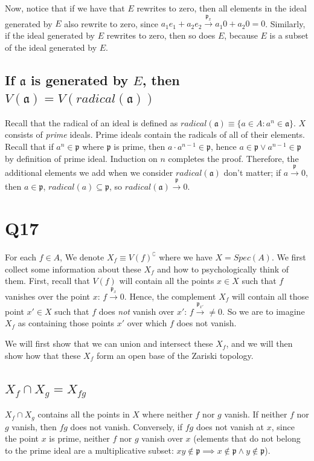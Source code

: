 \documentclass{book}
\newcommand{\frakp}{\ensuremath{\mathfrak{p}}}
\newcommand{\fraka}{\ensuremath{\mathfrak{a}}}
\renewcommand{\c}{\complement} %
\theoremstyle{definition}
\begin{document}
Now, notice that if we have that $E$ rewrites to zero, then all elements
in the ideal generated by $E$ also rewrite to zero, since $a_1 e_1 + a_2 e_2 \xrightarrow{\frakp_x} a_1 0 + a_2 0 = 0$.
Similarly, if the ideal generated by $E$ rewrites to zero, then so does $E$, 
because $E$ is a subset of the ideal generated by $E$.

\subsection{If $\fraka$ is generated by $E$, then $V(\fraka) = V(radical(\fraka))$}

Recall that the radical of an ideal is defined as $radical(\fraka) \equiv \{ a \in A : a^n \in \fraka \}$.
$X$ consists of \emph{prime} ideals. Prime ideals contain the radicals of all of
their elements. Recall that if $a^n \in \frakp$ where $\frakp$ is prime, then $a \cdot a^{n-1} \in \frakp$, hence
$a \in \frakp \lor a^{n-1} \in \frakp$ by definition of prime ideal. Induction on $n$ completes
the proof. Therefore, the additional elements we add when we consider $radical(\fraka)$
don't matter; if $a \xrightarrow{\frakp} 0$, then $a \in \frakp$, $radical(a) \subseteq \frakp$,
so $radical(\fraka) \xrightarrow{\frakp} 0$.

\section{Q17}

For each $f \in A$, We denote $X_f \equiv V(f)^\c$ where we have $X = Spec(A)$.
We first collect some information about these $X_f$ and how to psychologically
think of them. First, recall that $V(f)$ will contain all the points $x \in X$ such
that $f$ vanishes over the point $x$: $f \xrightarrow{\frakp_x} 0$. Hence,
the complement $X_f$ will contain all those point $x' \in X$ such that $f$
does \emph{not} vanish over $x'$: $f \xrightarrow{\frakp_{x'}} \neq 0$. So
we are to imagine $X_f$ as containing those points $x'$ over which $f$ does
not vanish.

We will first show that we can union and intersect these $X_f$, and we will
then show how that these $X_f$ form an open base of the Zariski topology.

\subsection{$X_f \cap X_g = X_{fg}$}
$X_f \cap X_g$ contains all the points in $X$ where neither $f$ nor $g$ vanish.
If neither $f$ nor $g$ vanish, then $fg$ does not vanish. Conversely, if $fg$
does not vanish at $x$, since the point $x$ is prime, neither $f$ nor $g$ vanish
over $x$ (elements that do not belong to the prime ideal are a multiplicative subset: 
$xy \not \in \frakp \implies x \not \in \frakp  \land y \not \in \frakp$).
\end{document}
